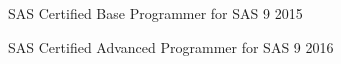 \documentclass[11pt, a4paper]{awesome-cv}
\begin{document}
\begin{cvhonors}

  \cvhonor
    {SAS Certified Base Programmer for SAS 9} %
    {} %
    {} %
    {2015} %

  \cvhonor
    {SAS Certified Advanced Programmer for SAS 9} %
    {} %
    {} %
    {2016} %

\end{cvhonors}

\end{document}
